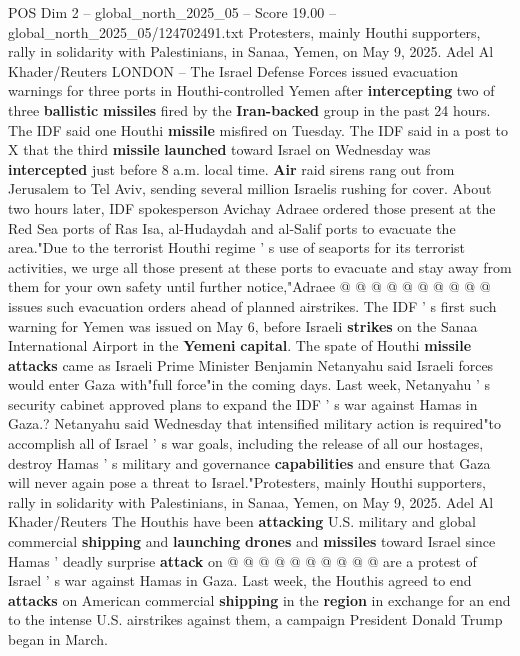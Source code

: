 \begin{textsample}{POS Dim 2 – global\_north\_2025\_05 – Score 19.00 – global\_north\_2025\_05/124702491.txt}  \label{ex:f2_pos_407}
Protesters, mainly Houthi supporters, rally in solidarity with Palestinians, in Sanaa, Yemen, on May 9, 2025.
Adel Al Khader/Reuters LONDON -- The Israel Defense Forces issued evacuation warnings for three ports in Houthi-controlled Yemen after \textbf{intercepting} two of three \textbf{ballistic} \textbf{missiles} fired by the \textbf{Iran-backed} group in the past 24 hours.
The IDF said one Houthi \textbf{missile} misfired on Tuesday.
The IDF said in a post to X that the third \textbf{missile} \textbf{launched} toward Israel on Wednesday was \textbf{intercepted} just before 8 a.m. local time. \textbf{Air} raid sirens rang out from Jerusalem to Tel Aviv, sending several million Israelis rushing for cover.
About two hours later, IDF spokesperson Avichay Adraee ordered those present at the Red Sea ports of Ras Isa, al-Hudaydah and al-Salif ports to evacuate the area."Due to the terrorist Houthi regime ' s use of seaports for its terrorist activities, we urge all those present at these ports to evacuate and stay away from them for your own safety until further notice,"Adraee @ @ @ @ @ @ @ @ @ @ issues such evacuation orders ahead of planned airstrikes.
The IDF ' s first such warning for Yemen was issued on May 6, before Israeli \textbf{strikes} on the Sanaa International Airport in the \textbf{Yemeni} \textbf{capital}.
The spate of Houthi \textbf{missile} \textbf{attacks} came as Israeli Prime Minister Benjamin Netanyahu said Israeli forces would enter Gaza with"full force"in the coming days.
Last week, Netanyahu ' s security cabinet approved plans to expand the IDF ' s war against Hamas in Gaza.?
Netanyahu said Wednesday that intensified military action is required"to accomplish all of Israel ' s war goals, including the release of all our hostages, destroy Hamas ' s military and governance \textbf{capabilities} and ensure that Gaza will never again pose a threat to Israel."Protesters, mainly Houthi supporters, rally in solidarity with Palestinians, in Sanaa, Yemen, on May 9, 2025.
Adel Al Khader/Reuters The Houthis have been \textbf{attacking} U.S. military and global commercial \textbf{shipping} and \textbf{launching} \textbf{drones} and \textbf{missiles} toward Israel since Hamas ' deadly surprise \textbf{attack} on @ @ @ @ @ @ @ @ @ @ are a protest of Israel ' s war against Hamas in Gaza.
Last week, the Houthis agreed to end \textbf{attacks} on American commercial \textbf{shipping} in the \textbf{region} in exchange for an end to the intense U.S. airstrikes against them, a campaign President Donald Trump began in March.

\end{textsample}
